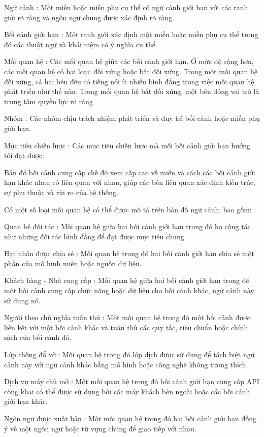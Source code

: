 Ngữ cảnh : Một miền hoặc miền phụ cụ thể có ngữ cảnh giới hạn với các ranh giới rõ ràng và ngôn ngữ chung được xác định rõ ràng.

Bối cảnh giới hạn : Một ranh giới xác định một miền hoặc miền phụ cụ thể trong đó các thuật ngữ và khái niệm có ý nghĩa cụ thể.

Mối quan hệ : Các mối quan hệ giữa các bối cảnh giới hạn. Ở mức độ rộng hơn, các mối quan hệ có hai loại: đối xứng hoặc bất đối xứng. Trong một mối quan hệ đối xứng, cả hai bên đều có tiếng nói ít nhiều bình đẳng trong việc mối quan hệ phát triển như thế nào. Trong mối quan hệ bất đối xứng, một bên đóng vai trò là trung tâm quyền lực rõ ràng

Nhóm : Các nhóm chịu trách nhiệm phát triển và duy trì bối cảnh hoặc miền phụ giới hạn.

Mục tiêu chiến lược : Các mục tiêu chiến lược mà mỗi bối cảnh giới hạn hướng tới đạt được.

Bản đồ bối cảnh cung cấp chế độ xem cấp cao về miền và cách các bối cảnh giới hạn khác nhau có liên quan với nhau, giúp các bên liên quan xác định kiến trúc, sự phụ thuộc và rủi ro của hệ thống.

Có một số loại mối quan hệ có thể được mô tả trên bản đồ ngữ cảnh, bao gồm:

Quan hệ đối tác : Mối quan hệ giữa hai bối cảnh giới hạn trong đó họ cộng tác như những đối tác bình đẳng để đạt được mục tiêu chung.

Hạt nhân được chia sẻ : Mối quan hệ trong đó hai bối cảnh giới hạn chia sẻ một phần của mô hình miền hoặc nguồn dữ liệu.

Khách hàng - Nhà cung cấp : Mối quan hệ giữa hai bối cảnh giới hạn trong đó một bối cảnh cung cấp chức năng hoặc dữ liệu cho bối cảnh khác, ngữ cảnh này sử dụng nó.

Người theo chủ nghĩa tuân thủ : Một mối quan hệ trong đó một bối cảnh được liên kết với một bối cảnh khác và tuân thủ các quy tắc, tiêu chuẩn hoặc chính sách của bối cảnh đó.

Lớp chống đổ vỡ : Mối quan hệ trong đó lớp dịch được sử dụng để tách biệt ngữ cảnh này với ngữ cảnh khác bằng mô hình hoặc công nghệ không tương thích.

Dịch vụ máy chủ mở : Một mối quan hệ trong đó bối cảnh giới hạn cung cấp API công khai có thể được sử dụng bởi các máy khách bên ngoài hoặc các bối cảnh giới hạn khác.

Ngôn ngữ được xuất bản : Một mối quan hệ trong đó hai bối cảnh giới hạn đồng ý về một ngôn ngữ hoặc từ vựng chung để giao tiếp với nhau.

